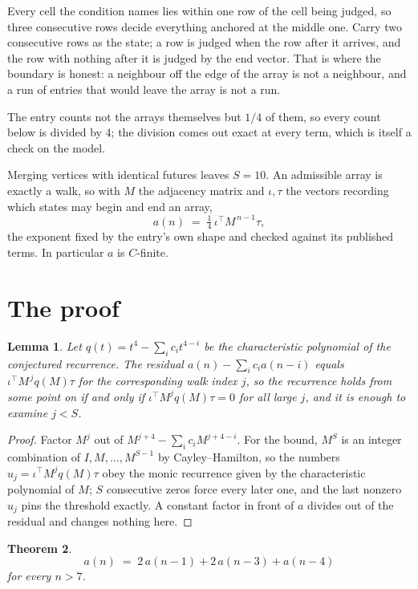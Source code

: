 \documentclass[11pt,a4paper]{article}
\theoremstyle{plain}
\newtheorem{theorem}{Theorem}
\newtheorem{lemma}[theorem]{Lemma}
\theoremstyle{definition}
\begin{document}
Every cell the condition names lies within one row of the cell being judged, so three consecutive rows decide everything anchored at the middle one. Carry two consecutive rows as the state; a row is judged when the row after it arrives, and the row with nothing after it is judged by the end vector. That is where the boundary is honest: a neighbour off the edge of the array is not a neighbour, and a run of entries that would leave the array is not a run.

The entry counts not the arrays themselves but $1/4$ of them, so every count below is divided by $4$; the division comes out exact at every term, which is itself a check on the model.

Merging vertices with identical futures leaves $S=10$. An admissible array is exactly a walk, so with $M$ the adjacency matrix and $\iota,\tau$ the vectors recording which states may begin and end an array,
\[
a(n)\;=\;\tfrac{1}{4}\,\iota^{\!\top}M^{\,n-1}\tau ,
\]
the exponent fixed by the entry's own shape and checked against its published terms. In
particular $a$ is $C$-finite.

\section{The proof}

\begin{lemma}\label{lem:crit}
Let $q(t)=t^{4}-\sum_i c_it^{4-i}$ be the characteristic polynomial of the
conjectured recurrence. The residual $a(n)-\sum_ic_ia(n-i)$ equals
$\iota^{\!\top}M^{\,j}q(M)\tau$ for the corresponding walk index $j$, so the recurrence
holds from some point on if and only if $\iota^{\!\top}M^{j}q(M)\tau=0$ for all large $j$,
and it is enough to examine $j<S$.
\end{lemma}

\begin{proof}
Factor $M^{j}$ out of $M^{j+4}-\sum_ic_iM^{j+4-i}$. For the bound, $M^{S}$
is an integer combination of $I,M,\dots,M^{S-1}$ by Cayley--Hamilton, so the numbers
$u_j=\iota^{\!\top}M^{j}q(M)\tau$ obey the monic recurrence given by the characteristic
polynomial of $M$; $S$ consecutive zeros force every later one, and the last nonzero $u_j$
pins the threshold exactly. A constant factor in front of $a$ divides out of the residual and
changes nothing here.
\end{proof}

\begin{theorem}
\[
a(n)\;=\;2\,a(n-1) + 2\,a(n-3) + a(n-4)
\]
for every $n>7$.
\end{theorem}
\end{document}
